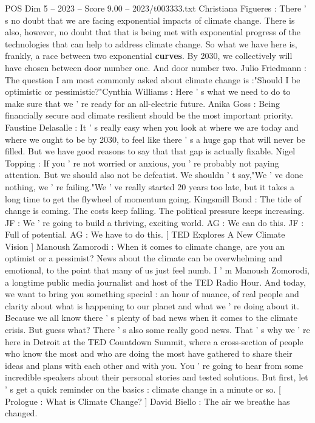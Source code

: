 \begin{textsample}{POS Dim 5 – 2023 – Score 9.00 – 2023/t003333.txt}  \label{ex:f5_pos_070}
Christiana Figueres : There ' s no doubt that we are facing exponential impacts of climate change.
There is also, however, no doubt that that is being met with exponential progress of the technologies that can help to address climate change.
So what we have here is, frankly, a race between two exponential \textbf{curves}.
By 2030, we collectively will have chosen between door number one.
And door number two.
Julio Friedmann : The question I am most commonly asked about climate change is :"Should I be optimistic or pessimistic?"Cynthia Williams : Here ' s what we need to do to make sure that we ' re ready for an all-electric future.
Anika Goss : Being financially secure and climate resilient should be the most important priority.
Faustine Delasalle : It ' s really easy when you look at where we are today and where we ought to be by 2030, to feel like there ' s a huge gap that will never be filled.
But we have good reasons to say that that gap is actually fixable.
Nigel Topping : If you ' re not worried or anxious, you ' re probably not paying attention.
But we should also not be defeatist.
We shouldn ' t say,"We ' ve done nothing, we ' re failing."We ' ve really started 20 years too late, but it takes a long time to get the flywheel of momentum going.
Kingsmill Bond : The tide of change is coming.
The costs keep falling.
The political pressure keeps increasing.
JF : We ' re going to build a thriving, exciting world.
AG : We can do this.
JF : Full of potential.
AG : We have to do this. [ TED Explores A New Climate Vision ] Manoush Zamorodi : When it comes to climate change, are you an optimist or a pessimist?
News about the climate can be overwhelming and emotional, to the point that many of us just feel numb.
I ' m Manoush Zomorodi, a longtime public media journalist and host of the TED Radio Hour.
And today, we want to bring you something special : an hour of nuance, of real people and clarity about what is happening to our planet and what we ' re doing about it.
Because we all know there ' s plenty of bad news when it comes to the climate crisis.
But guess what?
There ' s also some really good news.
That ' s why we ' re here in Detroit at the TED Countdown Summit, where a cross-section of people who know the most and who are doing the most have gathered to share their ideas and plans with each other and with you.
You ' re going to hear from some incredible speakers about their personal stories and tested solutions.
But first, let ' s get a quick reminder on the basics : climate change in a minute or so. [ Prologue : What is Climate Change? ] David Biello : The air we breathe has changed.

\end{textsample}
